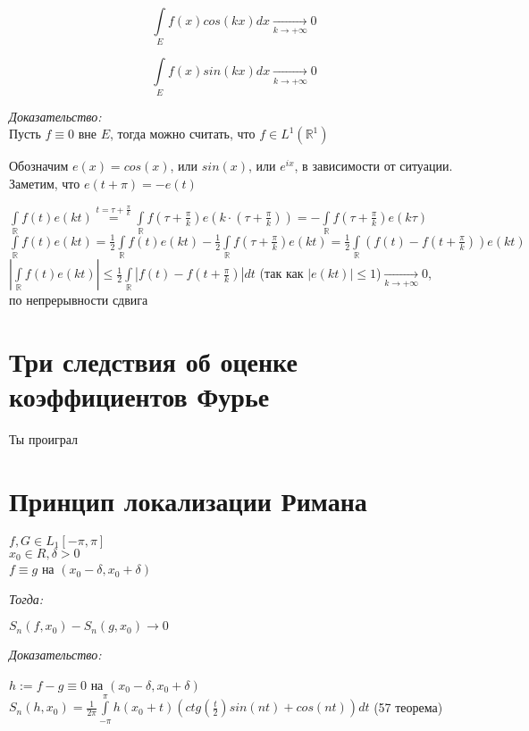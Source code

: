 \documentclass[paper=a4, fontsize=14pt]{report}
\begin{document}
    $$\int\limits_{E}f(x)cos(kx)dx \xrightarrow[k \to +\infty]{} 0$$

    $$\int\limits_{E}f(x)sin(kx)dx \xrightarrow[k \to +\infty]{} 0$$
    
    
		\emph{Доказательство:} \\
Пусть $f \equiv 0$ вне $E$, тогда можно считать, что $f \in L^1(\mathds{R}^1)$

Обозначим $e(x) = cos(x)$, или $sin(x)$, или $e^{ix}$, в зависимости от ситуации. Заметим, что $e(t + \pi) = -e(t)$

$\int\limits_{\mathds{R}}f(t)e(kt)  {\overset{t=\tau + \frac{\pi}{k}}{=}} \int\limits_{\mathds{R}}f(\tau + \frac{\pi}{k})e(k \cdot (\tau + \frac{\pi}{k})) = -\int\limits_{\mathds{R}}f(\tau + \frac{\pi}{k})e(k \tau)$ \\
$\int\limits_{\mathds{R}}f(t)e(kt) = \frac{1}{2}\int\limits_{\mathds{R}}f(t)e(kt) - \frac{1}{2}\int\limits_{\mathds{R}}f(\tau + \frac{\pi}{k})e(kt) = \frac{1}{2}\int\limits_{\mathds{R}}(f(t) - f(t + \frac{\pi}{k})) e(kt)$ \\

$|\int\limits_{\mathds{R}}f(t)e(kt)| \leq\frac{1}{2}\int\limits_{\mathds{R}}|f(t) - f(t + \frac{\pi}{k})|dt$ (так как $|e(kt)| \leq 1$)$ \xrightarrow[k \to +\infty]{}0$,\\по непрерывности сдвига

	    
    
    \section{Три следствия об оценке коэффициентов Фурье}
    Ты проиграл

    \section{Принцип локализации Римана}

    $ f, G \in L_1[-\pi, \pi] $\\
    $ x_0 \in R, \delta > 0 $\\
    $ f \equiv g $ на $ (x_0 - \delta, x_0 + \delta) $

    \emph{Тогда:}

    $ S_n(f, x_0) - S_n(g, x_0) \to 0 $
    
    
    \emph{Доказательство:}

$ h := f - g \equiv 0 $ на $ (x_0 - \delta, x_0 + \delta) $\\
$ S_n(h, x_0) = \frac{1}{2\pi} \int\limits_{-\pi}^{\pi} h(x_0 + t) (ctg(\frac{t}{2}) sin(nt) + cos(nt)) dt $ (57 теорема)
\end{document}

